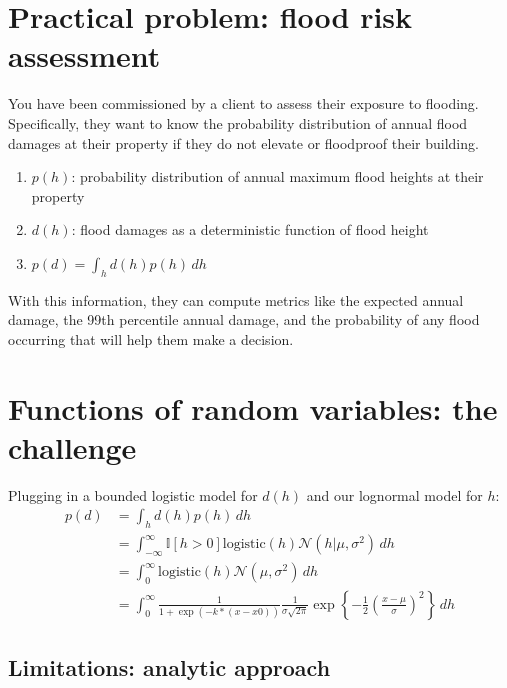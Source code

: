 \documentclass[
  letterpaper,
  DIV=11,
  numbers=noendperiod]{scrreprt}
\providecommand{\tightlist}{%
  \setlength{\itemsep}{0pt}\setlength{\parskip}{0pt}}
\begin{document}
\section{Practical problem: flood risk
assessment}\label{practical-problem-flood-risk-assessment}

You have been commissioned by a client to assess their exposure to
flooding. Specifically, they want to know the probability distribution
of annual flood damages at their property if they do not elevate or
floodproof their building.

\begin{enumerate}
\def\labelenumi{\arabic{enumi}.}
\tightlist
\item
  \(p(h)\): probability distribution of annual maximum flood heights at
  their property
\item
  \(d(h)\): flood damages as a deterministic function of flood height
\item
  \(p(d) = \int_h d(h) p(h) \, dh\)
\end{enumerate}

With this information, they can compute metrics like the expected annual
damage, the 99th percentile annual damage, and the probability of any
flood occurring that will help them make a decision.

\section{Functions of random variables: the
challenge}\label{functions-of-random-variables-the-challenge}

Plugging in a bounded logistic model for \(d(h)\) and our lognormal
model for \(h\): \[
\begin{align}
p(d) &= \int_h d(h) p(h) \, dh \\
&= \int_{-\infty}^\infty \mathbb{I}[h > 0] \text{logistic}(h) \mathcal{N}(h | \mu, \sigma^2) \, dh\\
&= \int_0^\infty \text{logistic}(h) \mathcal{N}(\mu, \sigma^2) \, dh\\
&= \int_0^\infty \frac{1}{1 + \exp(-k * (x - x0))} \frac {1}{\sigma {\sqrt {2\pi }}} \exp \left\{-{\frac {1}{2}}\left({\frac {x-\mu }{\sigma }}\right)^{2} \right\} \, dh
\end{align}
\]

\subsection{Limitations: analytic
approach}\label{limitations-analytic-approach}
\end{document}
